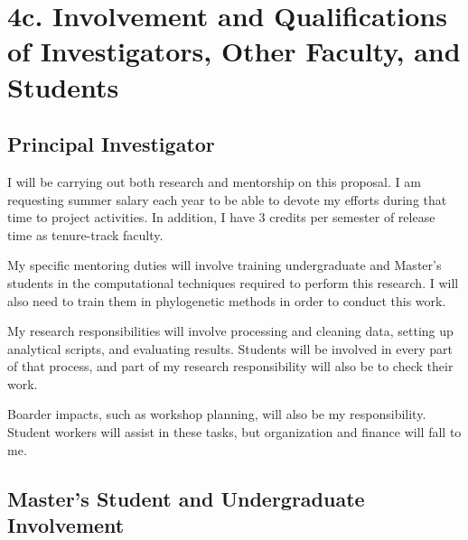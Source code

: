 \documentclass[12pt]{article}
\begin{document}
\section*{4c. Involvement and Qualifications of Investigators, Other Faculty, and Students}
\subsection*{Principal Investigator}

I will be carrying out both research and mentorship on this proposal.
I am requesting summer salary each year to be able to devote my efforts during that time to project activities.
In addition, I have 3 credits per semester of release time as tenure-track faculty. \par
My specific mentoring duties will involve training undergraduate and Master's students in the computational techniques required to perform this research.
I will also need to train them in phylogenetic methods in order to conduct this work. \par
My research responsibilities will involve processing and cleaning data, setting up analytical scripts, and evaluating results.
Students will be involved in every part of that process, and part of my research responsibility will also be to check their work. \par
Boarder impacts, such as workshop planning, will also be my responsibility.
Student workers will assist in these tasks, but organization and finance will fall to me. \par

\subsection*{Master's Student and Undergraduate Involvement}
\end{document}
